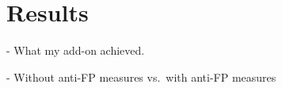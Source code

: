 \chapter{Results}

- What my add-on achieved.

- Without anti-FP measures vs.\ with anti-FP measures
